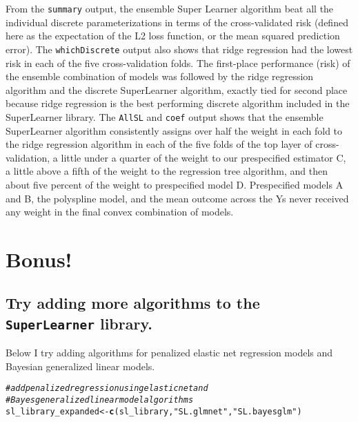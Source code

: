 \documentclass{article}\usepackage[]{graphicx}\usepackage[]{xcolor}
\makeatletter
\newcommand{\hlstr}[1]{\textcolor[rgb]{0.192,0.494,0.8}{#1}}%
\newcommand{\hlcom}[1]{\textcolor[rgb]{0.678,0.584,0.686}{\textit{#1}}}%
\newcommand{\hlstd}[1]{\textcolor[rgb]{0.345,0.345,0.345}{#1}}%
\newcommand{\hlkwb}[1]{\textcolor[rgb]{0.69,0.353,0.396}{#1}}%
\newcommand{\hlkwd}[1]{\textcolor[rgb]{0.737,0.353,0.396}{\textbf{#1}}}%
\newenvironment{kframe}{%
 \def\at@end@of@kframe{}%
 \ifinner\ifhmode%
  \def\at@end@of@kframe{\end{minipage}}%
  \begin{minipage}{\columnwidth}%
 \fi\fi%
 \def\FrameCommand##1{\hskip\@totalleftmargin \hskip-\fboxsep
 \colorbox{shadecolor}{##1}\hskip-\fboxsep
     \hskip-\linewidth \hskip-\@totalleftmargin \hskip\columnwidth}%
 \MakeFramed {\advance\hsize-\width
   \@totalleftmargin\z@ \linewidth\hsize
   \@setminipage}}%
 {\par\unskip\endMakeFramed%
 \at@end@of@kframe}
\newenvironment{knitrout}{}{} %
\makeatother
\begin{document}
From the \texttt{summary} output, the ensemble Super Learner algorithm beat all the individual discrete parameterizations in terms of the cross-validated risk (defined here as the expectation of the L2 loss function, or the mean squared prediction error). The \texttt{whichDiscrete} output also shows that ridge regression had the lowest risk in each of the five cross-validation folds. The first-place performance (risk) of the ensemble combination of models was followed by the ridge regression algorithm and the discrete SuperLearner algorithm, exactly tied for second place because ridge regression is the best performing discrete algorithm included in the SuperLearner library. The \texttt{AllSL} and \texttt{coef} output shows that the ensemble SuperLearner algorithm consistently assigns over half the weight in each fold to the ridge regression algorithm in each of the five folds of the top layer of cross-validation, a little under a quarter of the weight to our prespecified estimator C, a little above a fifth of the weight to the regression tree algorithm, and then about five percent of the weight to prespecified model D. Prespecified models A and B, the polyspline model, and the mean outcome across the Ys never received any weight in the final convex combination of models.



\section{Bonus!}

  \subsection{Try adding more algorithms to the \texttt{SuperLearner} library.}
  
Below I try adding algorithms for penalized elastic net regression models and Bayesian generalized linear models.

\begin{knitrout}
\color{fgcolor}\begin{kframe}
\begin{alltt}
\hlcom{# add penalized regression using elastic net and }
\hlcom{# Bayes generalized linear model algorithms}
\hlstd{sl_library_expanded} \hlkwb{<-} \hlkwd{c}\hlstd{(sl_library,} \hlstr{"SL.glmnet"}\hlstd{,} \hlstr{"SL.bayesglm"}\hlstd{)}
\end{alltt}
\end{kframe}
\end{knitrout}
\end{document}
